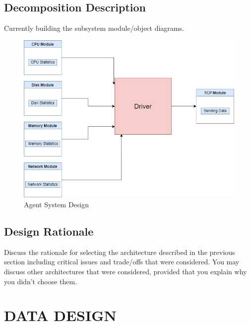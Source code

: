 \documentclass[letterpaper,12pt,oneside,listof=totoc]{scrreprt}
\begin{document}
\section{Decomposition Description}

Currently building the subsystem module/object diagrams.
\begin{figure}
\includegraphics[width=15cm]{SDDChart.jpg}
  \caption{\label{fig:module} Agent System Design }
\end{figure}

\section{Design Rationale}

Discuss the rationale for selecting the architecture described in the previous section including critical issues and trade/offs that were considered. You may discuss other architectures that were considered, provided that you explain why you didn't choose them.


\chapter{DATA DESIGN}
\end{document}
